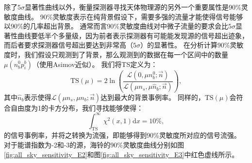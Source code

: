 除了$5\sigma$显著性曲线以外，衡量探测器寻找天体物理源的另外一个重要属性是90\%灵敏度曲线。
90\%灵敏度表示在纯背景假设下，需要多强的流量才能使得信号能够以90\%的几率超出背景。
通常而言90\%灵敏度曲线对中微子流量的要求会比$5\sigma$显著性曲线要低半个多量级，因为前者表示探测器有可能能发现源的信号超出迹象，而后者要求探测器信号超出要达到非常高（$5\sigma$）的显著性。
在分析计算90\%灵敏度时，我们假设只观测到了背景，那么观测到的数据在每一个区间中的数量$\mu(n_b^0 p_i^b)$（使用Asimov近似）。
我们将TS定义为：
\begin{equation}
    \mathrm{TS}(\mu) = 2 \ln \left( \frac
    {\mathcal{L}(0, \mu n_b^0; \vec{n})} 
    {\mathcal{L}(\mu n_s, \mu \hat{n}_b; \vec{n})} \right) ,
    \label{eq:ts_sensitivity}
\end{equation}
其中$\hat{n}_b$表示使得$\mathcal{L}(\mu n_s, \mu n_b; \vec{n})$达到最大的背景事例率。
同样的，$\mathrm{TS}(\mu)$会符合自由度为1的卡方分布，我们寻找能够使得：
\begin{equation}
    \int^\infty_\mathrm{TS} \chi^2(x, 1) \mathrm{d}x = 10\% ,
    \label{eq:ts_to_90}
\end{equation}
的信号事例率，并将之转换为流强，即能够得到90\%灵敏度所对应的信号流强。
对于能谱指数为-2和-3的源，海铃的90\%灵敏度曲线分别如图\ref{fig:all_sky_sensitivity_E2}和图\ref{fig:all_sky_sensitivity_E3}中红色虚线所示。

